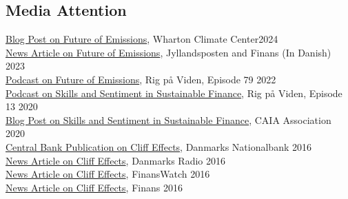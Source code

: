 \documentclass[11pt]{res} %
\newcommand{\fullhrulefill}{%
  \vspace{-1ex}%
  \hspace*{-\sectionwidth}\hrulefill%
  }
\begin{document}
\begin{resume}
\section{Media Attention} 
\fullhrulefill \newline
%
\href{https://esg.wharton.upenn.edu/centers-labs/climate-center/}{Blog Post on Future of Emissions}, Wharton Climate Center\hfill  {2024}\\
\href{https://finans.dk/debat/ECE16288410/doing-bad-esginvesteringer-gaar-til-klimasyndere/}{News Article on Future of Emissions}, Jyllandsposten and Finans (In Danish) \hfill  {2023}\\
\href{https://open.spotify.com/episode/0EJeK2Cb1jtDwjeLVOPAyw?si=63342eb6bf514976}{Podcast on Future of Emissions}, Rig p\aa{} Viden, Episode 79 \hfill  {2022}\\
\href{https://open.spotify.com/episode/4chVCZvDhoee3Kce00Thjr?si=xr4mAOM8QMS2BBpWDgkI8g}{Podcast on Skills and Sentiment in Sustainable Finance}, Rig p\aa{} Viden, Episode 13 \hfill  {2020}\\
\href{https://www.allaboutalpha.com/blog/2020/06/02/how-often-do-investors-google-climate-change/}{Blog Post on Skills and Sentiment in Sustainable Finance}, CAIA Association \hfill {2020}\\
\href{https://www.nationalbanken.dk/en/publications/Documents/2016/12/Finansial_stability_2_2016.pdf}{Central Bank Publication on Cliff Effects}, Danmarks Nationalbank \hfill {2016}\\
\href{https://www.dr.dk/nyheder/penge/risikoraad-advarer-om-boligboble}{News Article on Cliff Effects}, Danmarks Radio \hfill  {2016} \\
\href{https://finanswatch.dk/Finansnyt/article8784619.ece}{News Article on Cliff Effects}, FinansWatch \hfill  {2016} \\
\href{https://finans.dk/live/okonomi/ECE8784521/det-systemiske-raad-advarer-risiko-for-brandudsalg}{News Article on Cliff Effects}, Finans \hfill {2016}

\vspace{0.2in} %

\end{resume}
\end{document}
